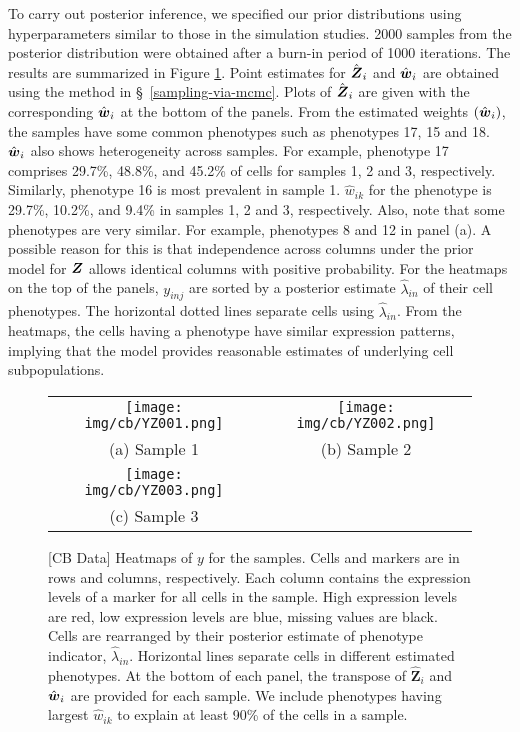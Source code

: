 \documentclass[12pt,]{article}
\def\Z{\bm{Z}}
\newcommand{\bZ}{\mbox{\boldmath $Z$}}
\newcommand{\bw}{\mbox{\boldmath $w$}}
\begin{document}
To carry out posterior inference, we specified our prior distributions using
hyperparameters similar to those in the simulation studies. 2000 samples from
the posterior distribution were obtained after a burn-in period of 1000
iterations. The results are summarized in Figure \ref{fig:cb-post-Z}.  Point
estimates for $\hat{\bZ}_i$ and $\hat{\bw}_i$ are obtained using the method in
\S~\ref{sampling-via-mcmc}.
Plots of $\hat{\bZ}_i$ are given with the corresponding $\hat{\bw}_i$ at the
bottom of the panels.  From the estimated weights $(\hat{\bw}_i)$, the samples
have some common phenotypes such as phenotypes 17, 15 and 18.
$\hat{\bw}_i$ also shows heterogeneity across samples.  For example, phenotype
17 comprises 29.7\%, 48.8\%, and 45.2\% of cells for samples 1, 2 and 3,
respectively.
%
Similarly, phenotype 16 is most prevalent in sample 1.  $\hat{w}_{ik}$ for the
phenotype is 29.7\%, 10.2\%, and 9.4\% in samples 1, 2 and 3, respectively.
%
Also, note that some phenotypes are very similar. For example, phenotypes 8 and
12 in panel (a).  A possible reason for this is that independence across
columns under the prior model for $\bZ$ allows identical columns with positive
probability.  For the heatmaps on the top of the panels, $y_{inj}$ are sorted
by a posterior estimate $\hat{\lambda}_{in}$ of their cell phenotypes. The horizontal dotted lines separate cells using $\hat{\lambda}_{in}$.  From
the heatmaps, the cells having a phenotype have similar expression patterns,
implying that the model provides reasonable estimates of underlying cell
subpopulations.
\begin{figure}[th!]
\begin{center}
  \begin{tabular}{cc}
  \texttt{[image: img/cb/YZ001.png]}&
  \texttt{[image: img/cb/YZ002.png]}\\
  (a) Sample 1 & (b) Sample 2 \\
  \texttt{[image: img/cb/YZ003.png]} &\\
  (c) Sample 3 & \\
  \end{tabular}
\end{center}
\vspace{-0.05in}
\caption{[CB Data]  Heatmaps of $y$ for the samples. Cells and markers are in
rows and columns, respectively. Each column contains the expression levels of
a marker for all cells in the sample. High expression levels are red, low
expression levels are blue, missing values are black.   Cells are rearranged
by their posterior estimate of phenotype indicator, $\hat{\lambda}_{in}$.
Horizontal lines separate cells in different estimated phenotypes.
At the bottom of each panel, the transpose of $\hat{\Z}_i$
and $\hat{\bw}_i$ are provided for each sample. We include phenotypes having
largest $\hat{w}_{ik}$ to explain at least 90\% of the cells in a sample.}
\label{fig:cb-post-Z}
\end{figure}
\end{document}
